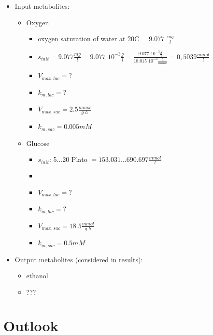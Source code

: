 \documentclass[a4paper,10pt]{article}
\begin{document}
\begin{itemize}
 \item Input metabolites:
 \begin{itemize}
  \item Oxygen
  \begin{itemize}
   \item oxygen saturation of water at 20\textdegree C = 9.077 $\frac{mg}{l}$ \cite{fao_water_1987}
   \item $s_{init} = 9.077 \frac{mg}{l} = 9.077 \,\, 10^{-3}  \frac{g}{l} = \frac{9.077 \,\, 10^{-3} \frac{g}{l}}{18.015 \,\, 10^{-3} \frac{g}{mmol}} = 0,5039 \frac{mmol}{l}$
   \item $V_{max,lac} = ?$
   \item $k_{m,lac} = ?$
   \item $V_{max,sac} = 2.5 \frac{mmol}{g \,\, h}$ \cite{hanly_dynamic_2014}
   \item $k_{m,sac} = 0.005 mM$ \cite{hanly_dynamic_2014}
  \end{itemize}
  \item Glucose
  \begin{itemize}
   \item $s_{init}$: 5...20 \textdegree Plato $= 153.031...690.697 \frac{mmol}{l}$
   \item \cite{bubnik1995sugar}
   \item $V_{max,lac} = ?$
   \item $k_{m,lac} = ?$
   \item $V_{max,sac} = 18.5 \frac{mmol}{g \,\, h}$ \cite{hanly_dynamic_2014}
   \item $k_{m,sac} = 0.5 mM$ \cite{hanly_dynamic_2014}
  \end{itemize}
 \end{itemize}
 \item Output metabolites (considered in results):
 \begin{itemize}
  \item ethanol
  \item ???
 \end{itemize}


\end{itemize}







\section{Outlook}
\end{document}
